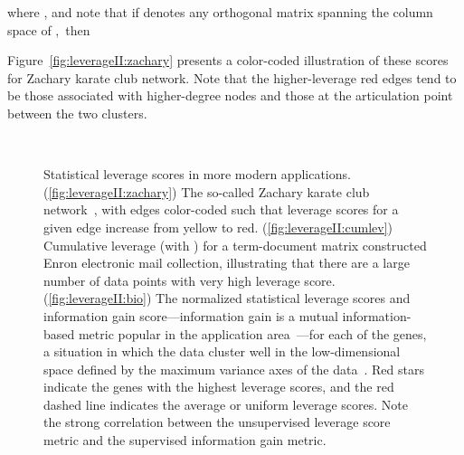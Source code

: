 \documentclass[twoside]{article}
\begin{document}
where , and note that if  denotes any 
orthogonal matrix spanning the column space of ,~then

Figure~\ref{fig:leverageII:zachary} presents a color-coded illustration of 
these scores for Zachary karate club network.
Note that the higher-leverage red edges tend to be those associated with 
higher-degree nodes and those at the articulation point between the two 
clusters.


\begin{figure}
   \begin{center}
 \qquad {} \\
       \end{center}
\caption{Statistical leverage scores in more modern applications.
(\ref{fig:leverageII:zachary})
The so-called Zachary karate club network~\cite{zachary77karate}, with edges
color-coded such that leverage scores for a given edge increase from yellow
to red.
(\ref{fig:leverageII:cumlev})
Cumulative leverage (with ) for a  term-document 
matrix constructed Enron electronic mail collection, illustrating 
that there are a large number of data points with very high leverage score.
(\ref{fig:leverageII:bio})
The normalized statistical leverage scores and information gain 
score---information gain is a mutual information-based metric popular in 
the application area~\cite{Paschou07b,CUR_PNAS}---for each of the  
genes, a situation in which the data cluster well in the low-dimensional 
space defined by the maximum variance axes of the data~\cite{CUR_PNAS}.
Red stars indicate the  genes with the highest leverage scores, and the 
red dashed line indicates the average or uniform leverage scores.
Note the strong correlation between the unsupervised leverage score metric 
and the supervised information gain metric.
}
\label{fig:leverageII}
\end{figure}
\end{document}

